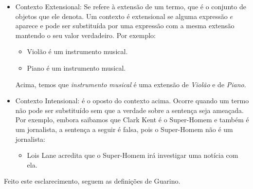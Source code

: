 \begin{itemize}
	\item Contexto Extensional: Se refere à extensão de um termo, que é o conjunto de objetos que ele denota. Um contexto é extensional se alguma expressão $ e $ aparece e pode ser substituída por uma expressão com a mesma extensão mantendo o seu valor verdadeiro. Por exemplo: 
	\begin{itemize}
		\item Violão é um instrumento musical.
		\item Piano é um instrumento musical.
	\end{itemize}
	Acima, temos que \textit{instrumento musical} é uma extensão de \textit{Violão} e de \textit{Piano}.
	\item Contexto Intensional: é o oposto do contexto acima. Ocorre quando um termo não pode ser substituído sem que a verdade sobre a sentença seja ameaçada. Por exemplo, embora saibamos que Clark Kent é o Super-Homem e também é um jornalista, a sentença a seguir é falsa, pois o Super-Homem não é um jornalista:
	\begin{itemize}
		\item Lois Lane acredita que o Super-Homem irá investigar uma notícia com ela. 
	\end{itemize}
	
\end{itemize}

Feito este esclarecimento, seguem as definições de Guarino.

